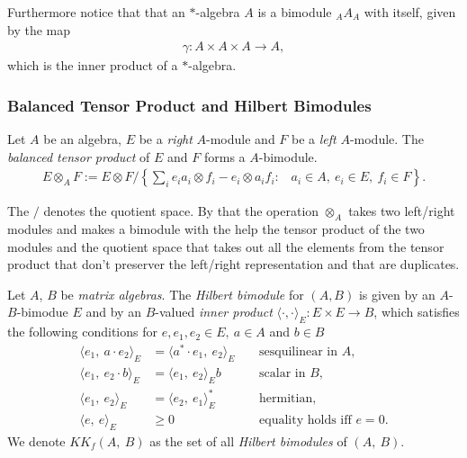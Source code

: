 
Furthermore notice that that an $*$-algebra $A$ is a bimodule ${}_A A_A$ with
itself, given by the map
\begin{align}
    \gamma: A\times A\times A \rightarrow A,
\end{align}
which is the inner product of a $*$-algebra.

\subsubsection{Balanced Tensor Product and Hilbert Bimodules}

\begin{definition}
    Let $A$ be an algebra, $E$ be a \textit{right} $A$-module and $F$ be a
    \textit{left} $A$-module.  The \textit{balanced tensor product} of $E$ and
    $F$ forms a $A$-bimodule.
    \begin{align}
        E \otimes _A F := E \otimes F / \left\{\sum _i e_i a_i \otimes f_i -
        e_i \otimes a_i f_i : \;\;\; a_i \in A,\ e_i \in E,\ f_i \in F
    \right\}.
    \end{align}
\end{definition}
The $/$ denotes the quotient space. By that the operation $\otimes _A$ takes
two left/right modules and makes a bimodule with the help the tensor product of
the two modules and the quotient space that takes out all the elements from the
tensor product that don't preserver the left/right representation and that are
duplicates.
\begin{definition}
    Let $A$, $B$ be \textit{matrix algebras}. The \textit{Hilbert bimodule} for
    $(A, B)$ is given by an $A$-$B$-bimodue $E$ and by an $B$-valued
    \textit{inner product} $\langle \cdot,\cdot\rangle_E: E\times E \rightarrow
    B$, which satisfies the following conditions for $e, e_1, e_2 \in
    E,\ a \in A$ and $b \in B$
\begin{align}
    \langle e_1,\ a\cdot e_2\rangle_E &= \langle a^*\cdot e_1,\ e_2\rangle_E
    \;\;\;\; & \text{sesquilinear in $A$},\\
    \langle e_1,\ e_2 \cdot b\rangle_E
             &= \langle e_1,\ e_2\rangle_E b \;\;\;\; & \text{scalar in $B$},\\
    \langle e_1,\ e_2\rangle_E &= \langle e_2,\ e_1\rangle^*_E \;\;\;\; &
    \text{hermitian}, \\
    \langle e,\ e\rangle_E &\ge 0 \;\;\;\; & \text{equality
    holds iff $e=0$}.
\end{align}
We denote $KK_f(A,\ B)$ as the set of all \textit{Hilbert bimodules} of $(A,\ B)$.
\end{definition}

